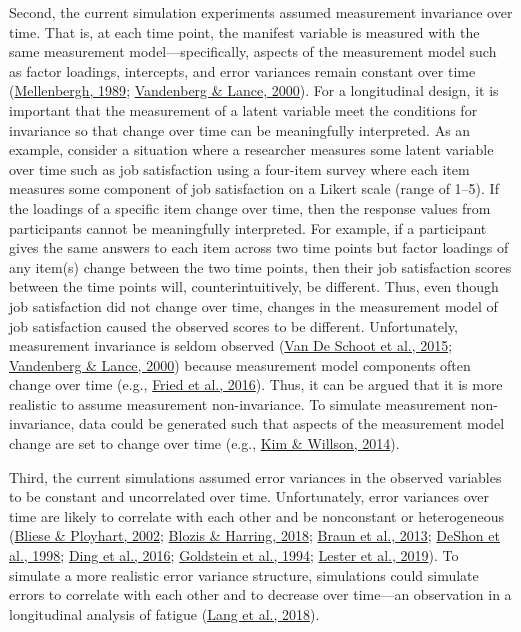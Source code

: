 \documentclass[
12pt, %
twoside,
english]{guelphthesis}
\begin{document}
Second, the current simulation experiments assumed measurement invariance over time. That is, at each time point, the manifest variable is measured with the same measurement model---specifically, aspects of the measurement model such as factor loadings, intercepts, and error variances remain constant over time (\protect\hyperlink{ref-mellenbergh1989}{Mellenbergh, 1989}; \protect\hyperlink{ref-vandenberg2000}{Vandenberg \& Lance, 2000}). For a longitudinal design, it is important that the measurement of a latent variable meet the conditions for invariance so that change over time can be meaningfully interpreted. As an example, consider a situation where a researcher measures some latent variable over time such as job satisfaction using a four-item survey where each item measures some component of job satisfaction on a Likert scale (range of 1--5). If the loadings of a specific item change over time, then the response values from participants cannot be meaningfully interpreted. For example, if a participant gives the same answers to each item across two time points but factor loadings of any item(s) change between the two time points, then their job satisfaction scores between the time points will, counterintuitively, be different. Thus, even though job satisfaction did not change over time, changes in the measurement model of job satisfaction caused the observed scores to be different. Unfortunately, measurement invariance is seldom observed (\protect\hyperlink{ref-vandeschoot2015}{Van De Schoot et al., 2015}; \protect\hyperlink{ref-vandenberg2000}{Vandenberg \& Lance, 2000}) because measurement model components often change over time (e.g., \protect\hyperlink{ref-fried2016}{Fried et al., 2016}). Thus, it can be argued that it is more realistic to assume measurement non-invariance. To simulate measurement non-invariance, data could be generated such that aspects of the measurement model change are set to change over time (e.g., \protect\hyperlink{ref-kim2014a}{Kim \& Willson, 2014}).

Third, the current simulations assumed error variances in the observed variables to be constant and uncorrelated over time. Unfortunately, error variances over time are likely to correlate with each other and be nonconstant or heterogeneous (\protect\hyperlink{ref-bliese2002}{Bliese \& Ployhart, 2002}; \protect\hyperlink{ref-blozis2018}{Blozis \& Harring, 2018}; \protect\hyperlink{ref-braun2013}{Braun et al., 2013}; \protect\hyperlink{ref-deshon1998}{DeShon et al., 1998}; \protect\hyperlink{ref-ding2016}{Ding et al., 2016}; \protect\hyperlink{ref-goldstein1994}{Goldstein et al., 1994}; \protect\hyperlink{ref-lester2019}{Lester et al., 2019}). To simulate a more realistic error variance structure, simulations could simulate errors to correlate with each other and to decrease over time---an observation in a longitudinal analysis of fatigue (\protect\hyperlink{ref-lang2018}{Lang et al., 2018}).
\end{document}

